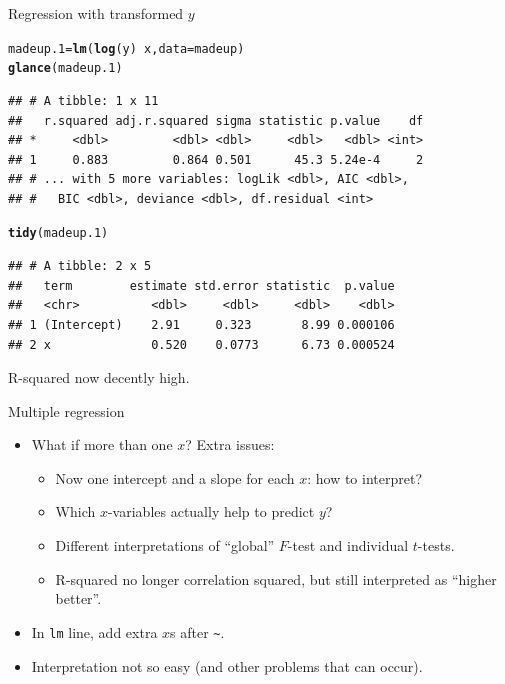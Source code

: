 \documentclass[unknownkeysallowed]{beamer}\usepackage[]{graphicx}\usepackage[]{color}
\makeatletter
\newcommand{\hlopt}[1]{\textcolor[rgb]{0,0,0}{#1}}%
\newcommand{\hlstd}[1]{\textcolor[rgb]{0.345,0.345,0.345}{#1}}%
\newcommand{\hlkwb}[1]{\textcolor[rgb]{0.69,0.353,0.396}{#1}}%
\newcommand{\hlkwc}[1]{\textcolor[rgb]{0.333,0.667,0.333}{#1}}%
\newcommand{\hlkwd}[1]{\textcolor[rgb]{0.737,0.353,0.396}{\textbf{#1}}}%
\newenvironment{kframe}{%
 \def\at@end@of@kframe{}%
 \ifinner\ifhmode%
  \def\at@end@of@kframe{\end{minipage}}%
  \begin{minipage}{\columnwidth}%
 \fi\fi%
 \def\FrameCommand##1{\hskip\@totalleftmargin \hskip-\fboxsep
 \colorbox{shadecolor}{##1}\hskip-\fboxsep
     \hskip-\linewidth \hskip-\@totalleftmargin \hskip\columnwidth}%
 \MakeFramed {\advance\hsize-\width
   \@totalleftmargin\z@ \linewidth\hsize
   \@setminipage}}%
 {\par\unskip\endMakeFramed%
 \at@end@of@kframe}
\newenvironment{knitrout}{}{} %
\makeatother
\begin{document}
\begin{frame}[fragile]{Regression with transformed $y$}

\begin{knitrout}\footnotesize
{}\color{fgcolor}\begin{kframe}
\begin{alltt}
\hlstd{madeup.1}\hlkwb{=}\hlkwd{lm}\hlstd{(}\hlkwd{log}\hlstd{(y)}\hlopt{~}\hlstd{x,} \hlkwc{data}\hlstd{=madeup)}
\hlkwd{glance}\hlstd{(madeup.1)}
\end{alltt}
\begin{verbatim}
## # A tibble: 1 x 11
##   r.squared adj.r.squared sigma statistic p.value    df
## *     <dbl>         <dbl> <dbl>     <dbl>   <dbl> <int>
## 1     0.883         0.864 0.501      45.3 5.24e-4     2
## # ... with 5 more variables: logLik <dbl>, AIC <dbl>,
## #   BIC <dbl>, deviance <dbl>, df.residual <int>
\end{verbatim}
\begin{alltt}
\hlkwd{tidy}\hlstd{(madeup.1)}
\end{alltt}
\begin{verbatim}
## # A tibble: 2 x 5
##   term        estimate std.error statistic  p.value
##   <chr>          <dbl>     <dbl>     <dbl>    <dbl>
## 1 (Intercept)    2.91     0.323       8.99 0.000106
## 2 x              0.520    0.0773      6.73 0.000524
\end{verbatim}
\end{kframe}
\end{knitrout}

R-squared now decently high.

\end{frame}


\begin{frame}[fragile]{Multiple regression}

  \begin{itemize}
  \item What if more than one $x$? Extra issues: %
    \begin{itemize}
    \item Now one intercept and a slope for each $x$: how to interpret?
    \item Which $x$-variables actually help to predict $y$?

    \item Different interpretations of ``global'' $F$-test and individual $t$-tests.
    \item R-squared no longer correlation squared, but still
      interpreted as ``higher better''.
    \end{itemize}
  \item In \verb-lm- line, add extra $x$s after \verb-~-.
  \item Interpretation not so easy (and other problems that can occur).
  \end{itemize}

\end{frame}
\end{document}
